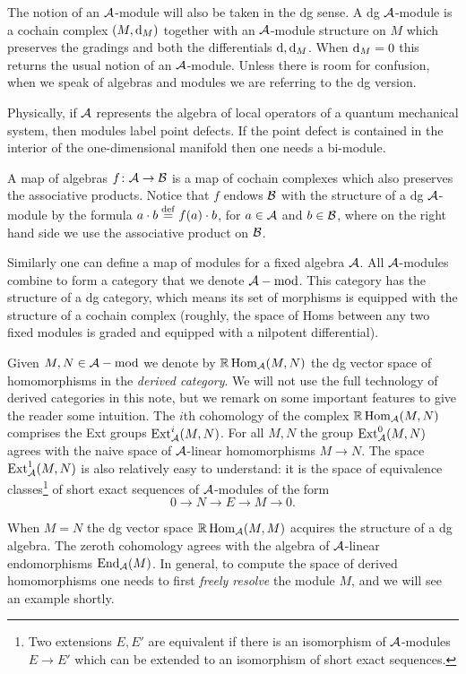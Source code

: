 \documentclass[11pt]{amsart}
\begin{document}
The notion of an $\mathcal A$-module will also be taken in the dg sense. A dg $\mathcal A$-module is a cochain complex $(M, {\rm d}_M)$ together with an $\mathcal A$-module structure on $M$ which preserves the gradings and both the differentials ${\rm d}, {\rm d}_M$. 
When ${\rm d}_M = 0$ this returns the usual notion of an $\mathcal A$-module. 
Unless there is room for confusion, when we speak of algebras and modules we are referring to the dg version.

Physically, if $\mathcal A$ represents the algebra of local operators of a quantum mechanical system, then modules label point defects. 
If the point defect is contained in the interior of the one-dimensional manifold then one needs a bi-module. 
 
A map of algebras $f \colon \mathcal A \to \mathcal B$ is a map of cochain complexes which also preserves the associative products.
Notice that $f$ endows $\mathcal B$ with the structure of a dg $\mathcal A$-module by the formula $a \cdot b \overset{\rm def}{=} f(a) \cdot b$, for $a \in \mathcal A$ and $b \in \mathcal B$, where on the right hand side we use the associative product on $\mathcal B$. 

Similarly one can define a map of modules for a fixed algebra $\mathcal A$.  All $\mathcal A$-modules combine to form a category that we denote $\mathcal A-{\rm mod}$.
This category has the structure of a dg category, which means its set of morphisms is equipped with the structure of a cochain complex (roughly, the space of Homs between any two fixed modules is graded and equipped with a nilpotent differential). 

Given $M,N \in \mathcal A-{\rm mod}$ we denote by $\mathbb{R}\operatorname{Hom}_\mathcal A(M,N)$ the dg vector space of homomorphisms in the {\em derived category}. 
We will not use the full technology of derived categories in this note, but we remark on some important features to give the reader some intuition. 
The $i$th cohomology of the complex $\mathbb{R}\operatorname{Hom}_{\mathcal A} (M,N)$ comprises the Ext groups ${\rm Ext}^i_{\mathcal A}(M,N)$. 
For all $M,N$ the group ${\rm Ext}^0_{\mathcal A}(M,N)$ agrees with the naive space of $\mathcal A$-linear homomorphisms $M \to N$. 
The space ${\rm Ext}^1_{\mathcal A}(M,N)$ is also relatively easy to understand: it is the space of equivalence classes\footnote{Two extensions $E,E'$ are equivalent if there is an isomorphism of $\mathcal A$-modules $E \to E'$ which can be extended to an isomorphism of short exact sequences.} of short exact sequences of $\mathcal A$-modules of the form
\[
0 \to N \to E \to M \to 0 .
\]

 
When $M = N$ the dg vector space $\mathbb{R}\operatorname{Hom}_\mathcal A(M,M)$ acquires the structure of a dg algebra.
The zeroth cohomology agrees with the algebra of $\mathcal A$-linear endomorphisms ${\rm End}_{\mathcal A}(M)$.  
In general, to compute the space of derived homomorphisms one needs to first \textit{freely resolve} the module $M$, and we will see an example shortly.
\end{document}
